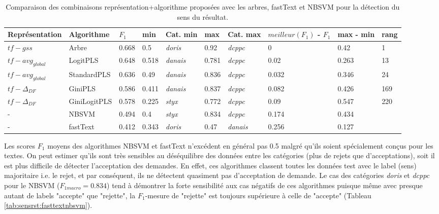 \begin{table}[!htb]	
	\scriptsize
	
	
	
	\centering
	\begin{tabular}{|l|l|l|l|l|l|l|l|l|l|}
		\hline
		\textbf{Représentation} & \textbf{Algorithme} & \textbf{$F_{1}$} & \textbf{min} & \textbf{Cat. min} & \textbf{max} & \textbf{Cat. max} & \textbf{$meilleur(F_1)$ - $F_1$} & \textbf{max - min} & \textbf{rang} \\ \hline
		$tf-gss$ & Arbre & 0.668 & 0.5 & \textit{doris} & 0.92 & \textit{dcppc} & 0 & 0.42 & 1 \\ \hline
		$tf - avg_{global}$ & LogitPLS & 0.648 & 0.518 & \textit{danais} & 0.781 & \textit{dcppc} & 0.02 & 0.263 & 13 \\ \hline
		$tf - avg_{global}$ & StandardPLS & 0.636 & 0.49 & \textit{danais} & 0.836 & \textit{dcppc} & 0.032 & 0.346 & 24 \\ \hline
		$tf - \Delta_{DF}$ & GiniPLS & 0.586 & 0.411 & \textit{danais} & 0.837 & \textit{dcppc} & 0.082 & 0.426 & 169 \\ \hline
		$tf - \Delta_{DF}$ & GiniLogitPLS & 0.578 & 0.225 & \textit{styx} & 0.772 & \textit{dcppc} & 0.09 & 0.547 & 220 \\ \hline
		- & NBSVM & 0.494 & 0.4 & \textit{styx} & 0.834 & \textit{dcppc} & 0.174 & 0.434 & \\ \hline
		- & fastText & 0.412 & 0.343 & \textit{doris} & 0.47 & \textit{danais} & 0.256 & 0.127 & \\ \hline
	\end{tabular}
\caption{Comparaison des combinaisons représentation+algorithme proposées avec les arbres, fastText et NBSVM pour la détection du sens du résultat.}\label{tab:sensrst:global}
\end{table}

 Les scores $F_1$ moyens des algorithmes NBSVM et fastText n'excédent en général pas 0.5 malgré qu'ils soient spécialement conçus pour les textes. On peut estimer qu'ils sont très sensibles au déséquilibre des données entre les catégories (plus de rejets que d'acceptations), soit il est plus difficile de détecter l'acceptation des demandes. En effet, ces algorithmes classent toutes les données test avec le label (sens) majoritaire i.e. le rejet, et par conséquent, ils ne détectent quasiment pas d'acceptation de demande. Le cas des catégories \textit{doris} et \textit{dcppc} pour le NBSVM ($F_{1macro} = 0.834$) tend à démontrer la forte sensibilité aux cas négatifs de ces algorithmes puisque même avec presque autant de labels "accepte" que "rejette", la $F_1$-mesure de "rejette" est toujours supérieure à celle de "accepte" (Tableau \ref{tab:sensrst:fasttextnbsvm}). 
 
